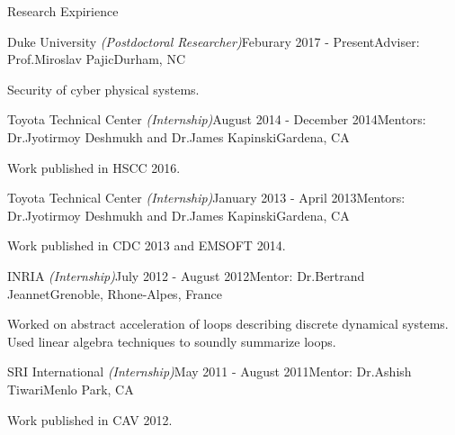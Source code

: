 \documentclass{resume} %
\begin{document}
\begin{rSection}{Research Expirience}

\begin{rSubsection}{Duke University \emph{(Postdoctoral Researcher)}}{Feburary 2017 - Present}{Adviser: Prof.Miroslav Pajic}{Durham, NC}
\item[]
\vspace{-0.1cm}
Security of cyber physical systems.
\end{rSubsection}

\begin{rSubsection}{Toyota Technical Center \emph{(Internship)}}{August 2014 - December 2014}{Mentors: Dr.Jyotirmoy Deshmukh and Dr.James Kapinski}{Gardena, CA}
\item[]
\vspace{-0.1cm}
Work published in HSCC 2016.
\end{rSubsection}

\begin{rSubsection}{Toyota Technical Center \emph{(Internship)}}{January 2013 - April 2013}{Mentors: Dr.Jyotirmoy Deshmukh and Dr.James Kapinski}{Gardena, CA}
\item[]
\vspace{-0.1cm}
Work published in CDC 2013 and EMSOFT 2014.
\end{rSubsection}

\begin{rSubsection}{INRIA \emph{(Internship)}}{July 2012 - August 2012}{Mentor: Dr.Bertrand Jeannet}{Grenoble, Rhone-Alpes, France}
\item[]
\vspace{-0.1cm}
	Worked on abstract acceleration of loops describing discrete dynamical systems.\\
    Used linear algebra techniques to soundly summarize loops.
\end{rSubsection}

\begin{rSubsection}{SRI International \emph{(Internship)}}{May 2011 - August 2011}{Mentor: Dr.Ashish Tiwari}{Menlo Park, CA}
\item[]
\vspace{-0.1cm}
Work published in CAV 2012.
\end{rSubsection}
\end{rSection}
\end{document}
